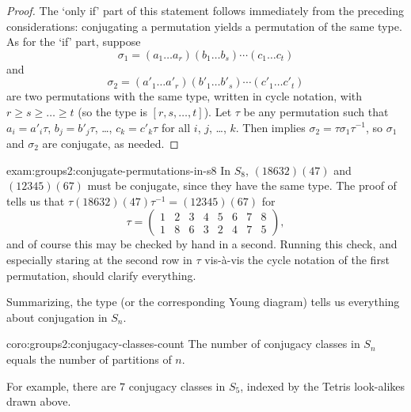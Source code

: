 \begin{proof}
  The `only if' part of this statement follows immediately from the
  preceding considerations: conjugating a permutation yields a
  permutation of the same type. As for the `if' part, suppose
  \[
    \sigma_1 = (a_1 \dots a_r)(b_1 \dots b_s)\cdots(c_1 \dots c_t)
  \]
  and
  \[
    \sigma_2 = (a'_1 \dots a'_r)(b'_1 \dots b'_s)\cdots(c'_1 \dots
    c'_t)
  \]
  are two permutations with the same type, written in cycle notation,
  with $r \geq s \geq \dots \geq t$ (so the type is
  $[r, s, \dots, t]$). Let $\tau$ be any permutation such that
  $a_i = a'_i\tau$, $b_j = b'_j\tau$, \dots, $c_k = c'_k\tau$ for all
  $i$, $j$, \dots, $k$. Then 
  implies $\sigma_2 = \tau\sigma_1\tau^{-1}$, so $\sigma_1$ and
  $\sigma_2$ are conjugate, as needed.
\end{proof}
\begin{exam}{}{exam:groups2:conjugate-permutations-in-s8}
  In $S_8$, $(18632)(47)$ and $(12345)(67)$ must be conjugate, since
  they have the same type. The proof of
   tells us that
  $\tau(18632)(47)\tau^{-1} = (12345)(67)$ for
  \[
    \tau = \begin{pmatrix} 1 & 2 & 3 & 4 & 5 & 6 & 7 & 8 \\
      1 & 8 & 6 & 3 & 2 & 4 & 7 & 5 \end{pmatrix},
  \]
  and of course this may be checked by hand in a second. Running this
  check, and especially staring at the second row in $\tau$
  vis-\`{a}-vis the cycle notation of the first permutation, should
  clarify everything.
\end{exam}
Summarizing, the type (or the corresponding Young diagram) tells us
everything about conjugation in $S_n$.

\begin{coro}{}{coro:groups2:conjugacy-classes-count}
  The number of conjugacy classes in $S_n$ equals the number of
  partitions of $n$.
\end{coro}
For example, there are $7$ conjugacy classes in $S_5$, indexed by the
Tetris look-alikes drawn above.

